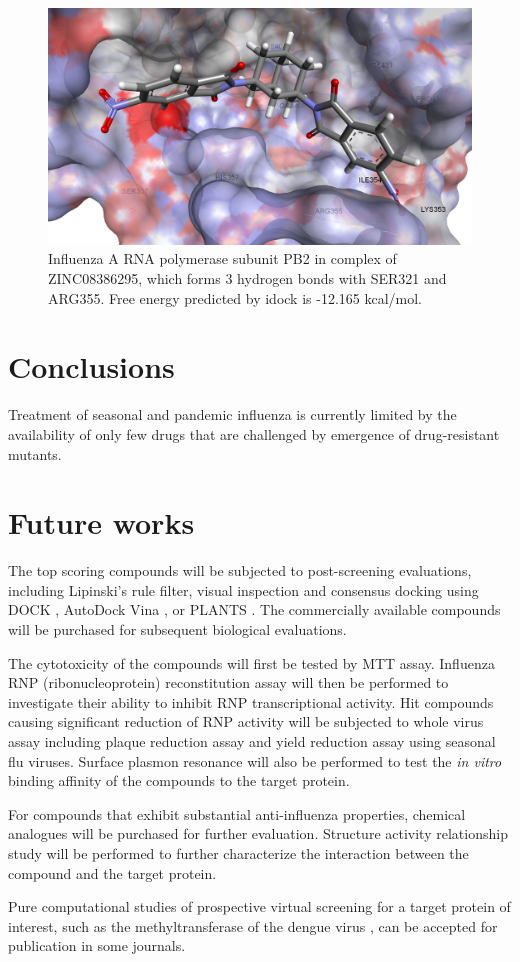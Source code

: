 \begin{figure}
\centering
\includegraphics[width=\linewidth]{../influenza/2VQZ-ZINC08386295.png}
\caption{Influenza A RNA polymerase subunit PB2 in complex of ZINC08386295, which forms 3 hydrogen bonds with SER321 and ARG355. Free energy predicted by idock is -12.165 kcal/mol.}
\label{influenza:2VQZ-ZINC08386295}
\end{figure}

\section{Conclusions}

Treatment of seasonal and pandemic influenza is currently limited by the availability of only few drugs that are challenged by emergence of drug-resistant mutants.

\section{Future works}

The top scoring compounds will be subjected to post-screening evaluations, including Lipinski's rule filter, visual inspection and consensus docking using DOCK \citep{1222}, AutoDock Vina \citep{595}, or PLANTS \citep{610,607,779}. The commercially available compounds will be purchased for subsequent biological evaluations.

The cytotoxicity of the compounds will first be tested by MTT assay. Influenza RNP (ribonucleoprotein) reconstitution assay will then be performed to investigate their ability to inhibit RNP transcriptional activity. Hit compounds causing significant reduction of RNP activity will be subjected to whole virus assay including plaque reduction assay and yield reduction assay using seasonal flu viruses. Surface plasmon resonance will also be performed to test the \textit{in vitro} binding affinity of the compounds to the target protein. 

For compounds that exhibit substantial anti-influenza properties, chemical analogues will be purchased for further evaluation. Structure activity relationship study will be performed to further characterize the interaction between the compound and the target protein.

Pure computational studies of prospective virtual screening for a target protein of interest, such as the methyltransferase of the dengue virus \citep{1435}, can be accepted for publication in some journals.

\chapterend
